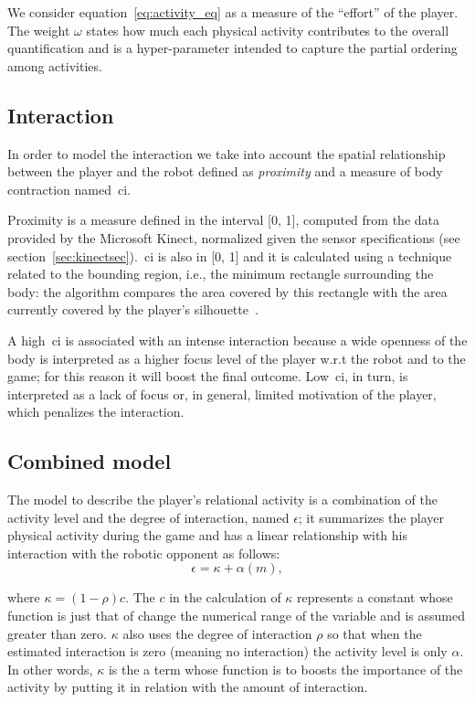 We consider equation~\ref{eq:activity_eq} as a measure of the ``effort'' of the player. The weight $\omega$ states how much each physical activity contributes to the overall quantification and is a hyper-parameter intended to capture the partial ordering among activities.

\subsection{Interaction}\label{Interaction}
In order to model the interaction we take into account the spatial relationship between the player and the robot defined as \textit{proximity} and a measure of body contraction named~\gls{ci}.

Proximity is a measure defined in the interval [0, 1], computed from the data provided by the Microsoft Kinect\textsuperscript{\textregistered}, normalized given the sensor specifications (see section~\ref{sec:kinectsec}).~\gls{ci} is also in [0, 1] and it is calculated using a technique related to the bounding region, i.e., the minimum rectangle surrounding the body: the algorithm compares the area covered by this rectangle with the area currently covered by the player's silhouette~\citep{castellano_recognising_2007}.

A high~\gls{ci} is associated with an intense interaction because a wide openness of the body is interpreted as a higher focus level of the player w.r.t the robot and to the game; for this reason it will boost the final outcome. Low~\gls{ci}, in turn, is interpreted as a lack of focus or, in general, limited motivation of the player, which penalizes the interaction.%

\subsection{Combined model}\label{sec:engagement}
The model to describe the player's relational activity is a combination of the activity level and the degree of interaction, named $\epsilon$; it summarizes the player physical activity during the game and has a linear relationship with his interaction with the robotic opponent as follows: 
\begin{equation}
\label{enagementeq}
\epsilon=\kappa + \alpha(m),
\end{equation}

where $\kappa= (1-\rho)c$.  The $c$ in the calculation of $\kappa$ represents a constant whose function is just that of change the numerical range of the variable and is assumed greater than zero. $\kappa$ also uses the degree of interaction $\rho$ so that when the estimated interaction is zero (meaning no interaction) the activity level is only $\alpha$. In other words, $\kappa$ is the a term whose function is to boosts the importance of the activity by putting it in relation with the amount of interaction. 

